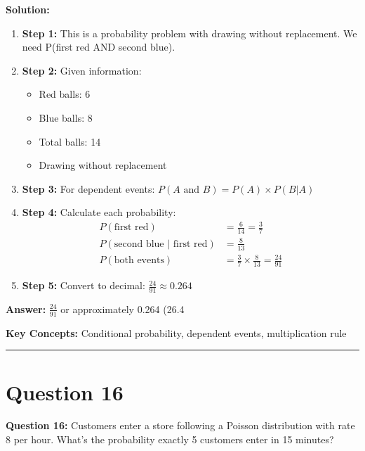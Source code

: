 \documentclass[12pt]{article}
\begin{document}
\textbf{Solution:}
\begin{enumerate}
\item \textbf{Step 1:} This is a probability problem with drawing without replacement. We need P(first red AND second blue).

\item \textbf{Step 2:} Given information:
\begin{itemize}
\item Red balls: 6
\item Blue balls: 8
\item Total balls: 14
\item Drawing without replacement
\end{itemize}

\item \textbf{Step 3:} For dependent events: $P(A \text{ and } B) = P(A) \times P(B|A)$

\item \textbf{Step 4:} Calculate each probability:
\begin{align}
P(\text{first red}) &= \frac{6}{14} = \frac{3}{7} \\
P(\text{second blue | first red}) &= \frac{8}{13} \\
P(\text{both events}) &= \frac{3}{7} \times \frac{8}{13} = \frac{24}{91}
\end{align}

\item \textbf{Step 5:} Convert to decimal: $\frac{24}{91} \approx 0.264$
\end{enumerate}

\textbf{Answer:} $\frac{24}{91}$ or approximately 0.264 (26.4%

\textbf{Key Concepts:} Conditional probability, dependent events, multiplication rule

\hrule
\vspace{1em}

\newpage

\section{Question 16}

\textbf{Question 16:} Customers enter a store following a Poisson distribution with rate 8 per hour. What's the probability exactly 5 customers enter in 15 minutes?
\end{document}

